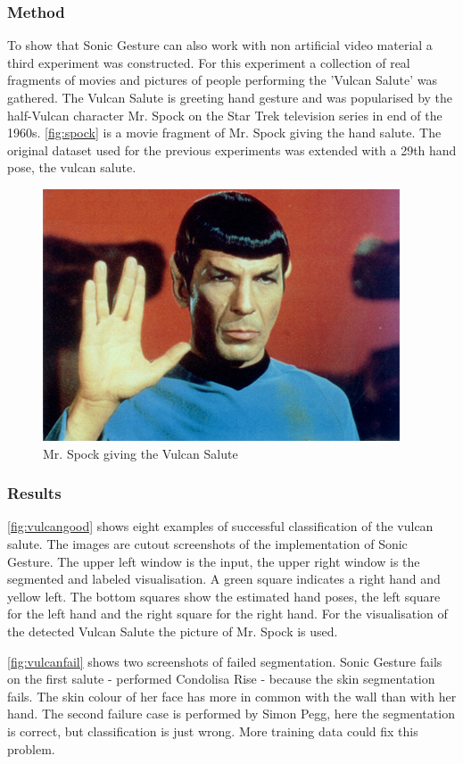 \subsubsection{Method}
To show that Sonic Gesture can also work with non artificial video material a third experiment was constructed. For this experiment a collection of real fragments of movies and pictures of people performing the 'Vulcan Salute' was gathered. The Vulcan Salute is greeting hand gesture and was popularised by the half-Vulcan character Mr. Spock on the Star Trek television series in end of the 1960s. \autoref{fig:spock} is a movie fragment of Mr. Spock giving the hand salute. The original dataset used for the previous experiments was extended with a 29th hand pose, the vulcan salute. 

\begin{figure}[htbp]
\centering{}
\includegraphics[width=0.6\linewidth]{figures/spock/salute.png}
\caption{Mr. Spock giving the Vulcan Salute}
\label{fig:spock}
\end{figure}


\subsubsection{Results}
\autoref{fig:vulcangood} shows eight examples of successful classification of the vulcan salute. The images are cutout screenshots of the implementation of Sonic Gesture. The upper left window is the input, the upper right window is the segmented and labeled visualisation. A green square indicates a right hand and yellow left. The bottom squares show the estimated hand poses, the left square for the left hand and the right square for the right hand. For the visualisation of the detected Vulcan Salute the picture of Mr. Spock is used.

\autoref{fig:vulcanfail} shows two screenshots of failed segmentation. Sonic Gesture fails on the first salute - performed Condolisa Rise - because the skin segmentation fails. The skin colour of her face has more in common with the wall than with her hand. The second failure case is performed by Simon Pegg, here the segmentation is correct, but classification is just wrong. More training data could fix this problem.

